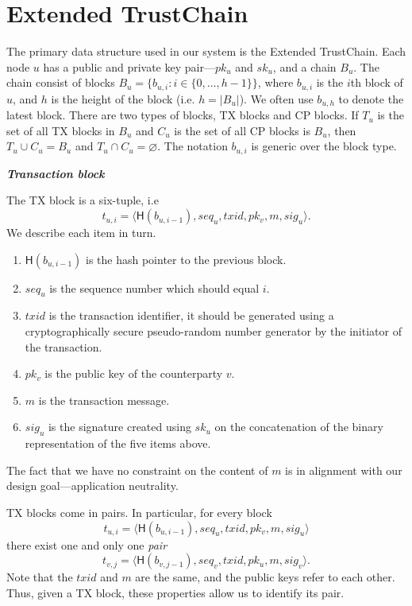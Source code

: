 \section{Extended TrustChain}
The primary data structure used in our system is the Extended TrustChain.
Each node $u$ has a public and private key pair---$pk_u$ and $sk_u$, and a chain $B_u$.
The chain consist of blocks $B_u = \{ b_{u, i} : i \in \{ 0, \dots, h - 1 \} \}$,
where $b_{u, i}$ is the $i$th block of $u$,
and $h$ is the height of the block (i.e. $h = |B_u|$).
We often use $b_{u, h}$ to denote the latest block.
There are two types of blocks, TX blocks and CP blocks.
If $T_u$ is the set of all TX blocks in $B_u$ and $C_u$ is the set of all CP blocks is $B_u$,
then $T_u \cup C_u = B_u$ and $T_u \cap C_u = \varnothing$.
The notation $b_{u, i}$ is generic over the block type.

\begin{definition}
\textbf{\emph{Transaction block}}

The TX block is a six-tuple, i.e
$$t_{u, i} = \langle \textsf{H}(b_{u, i - 1}), seq_u, txid, pk_v, m, sig_u \rangle.$$
We describe each item in turn.
\begin{enumerate}
\item $\textsf{H}(b_{u, i - 1})$ is the hash pointer to the previous block.
\item $seq_u$ is the sequence number which should equal $i$.
\item $txid$ is the transaction identifier, it should be generated using a cryptographically secure pseudo-random number generator by the initiator of the transaction.
\item $pk_v$ is the public key of the counterparty $v$.
\item $m$ is the transaction message.
\item $sig_u$ is the signature created using $sk_u$ on the concatenation of the binary representation of the five items above.
\end{enumerate}
The fact that we have no constraint on the content of $m$ is in alignment with our design goal---application neutrality.

TX blocks come in pairs.
In particular, for every block 
$$t_{u, i} = \langle \textsf{H}(b_{u, i - 1}), seq_u, txid, pk_v, m, sig_u \rangle$$
there exist one and only one \emph{pair} 
$$t_{v, j} = \langle \textsf{H}(b_{v, j - 1}), seq_v, txid, pk_u, m, sig_v \rangle.$$
Note that the $txid$ and $m$ are the same, and the public keys refer to each other.
Thus, given a TX block, these properties allow us to identify its pair.
\end{definition}

